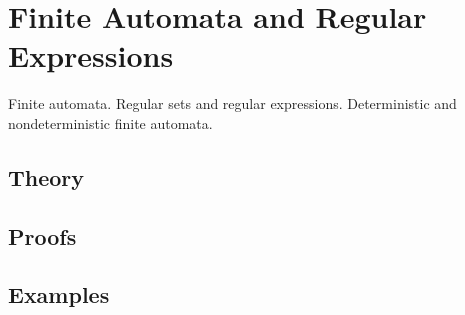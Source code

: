 
\section{Finite Automata and Regular Expressions}
\label{sec:2.3a.07-finite-automata}

\begin{ticket}
Finite automata. Regular sets and regular expressions. Deterministic and nondeterministic finite automata.
\end{ticket}

\subsection*{Theory}

\subsection*{Proofs}

\subsection*{Examples}
